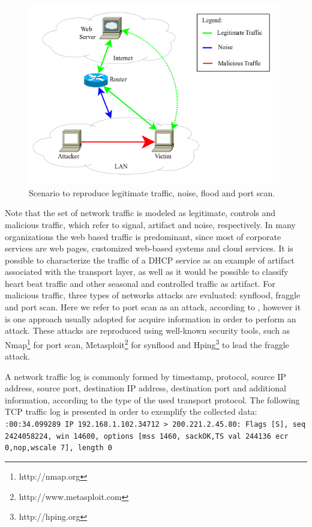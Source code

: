 \begin{figure}[h!]
     \centering 
     \includegraphics[width=11cm]{figures/ch2/fig09.png}
     \caption{Scenario to reproduce legitimate traffic, noise, flood and port scan.}
     \label{fig:2.01}
\end{figure}

Note that the set of network traffic is modeled as legitimate, controls and malicious traffic, which refer to signal, artifact and noise, respectively. In many organizations the web based traffic is predominant, since most of corporate services are  web pages, customized web-based systems and cloud services. It is possible to characterize the traffic of a DHCP service as an example of artifact associated with the transport layer, as well as it would be possible to classify heart beat traffic and other seasonal and controlled traffic as artifact. For malicious traffic, three types of networks attacks are evaluated: synflood, fraggle and port scan. Here we refer to port scan as an attack, according to \cite{ahmed2016survey,moustafa2019holistic}, however it is one approach usually adopted for acquire information in order to perform an attack. These attacks are reproduced using well-known security tools, such as Nmap\footnote{http://nmap.org} for port scan, Metasploit\footnote{http://www.metasploit.com} for synflood and Hping\footnote{http://hping.org} to lead the fraggle attack.

A network traffic log is commonly formed by timestamp, protocol, source IP address, source port, destination IP address, destination port and additional information, according to the type of the used transport protocol. The following TCP traffic log is presented in order to exemplify the collected data:
\newline
\newline
\texttt{:00:34.099289 IP 192.168.1.102.34712 > 200.221.2.45.80: Flags [S], seq 2424058224, win 14600, options [mss 1460, sackOK,TS val 244136 ecr 0,nop,wscale 7], length 0}
\newline

